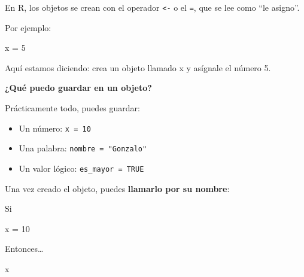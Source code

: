 \documentclass[
  letterpaper,
  DIV=11,
  numbers=noendperiod,
  twoside]{scrreprt}
\newenvironment{Shaded}{\begin{snugshade}}{\end{snugshade}}
\newcommand{\DecValTok}[1]{\textcolor[rgb]{0.68,0.00,0.00}{#1}}
\newcommand{\NormalTok}[1]{\textcolor[rgb]{0.00,0.23,0.31}{#1}}
\newcommand{\OtherTok}[1]{\textcolor[rgb]{0.00,0.23,0.31}{#1}}
\providecommand{\tightlist}{%
  \setlength{\itemsep}{0pt}\setlength{\parskip}{0pt}}\usepackage{longtable,booktabs,array}
\begin{document}
\begin{tcolorbox}[enhanced jigsaw, titlerule=0mm, title=\textcolor{quarto-callout-note-color}{\faInfo}\hspace{0.5em}{Dato}, colback=white, opacityback=0, breakable, toprule=.15mm, left=2mm, leftrule=.75mm, colframe=quarto-callout-note-color-frame, bottomtitle=1mm, rightrule=.15mm, opacitybacktitle=0.6, coltitle=black, arc=.35mm, bottomrule=.15mm, toptitle=1mm, colbacktitle=quarto-callout-note-color!10!white]

En R, los objetos se crean con el operador \texttt{\textless{}-} o el
\texttt{=}, que se lee como ``le asigno''.

Por ejemplo:

\begin{Shaded}
\begin{Highlighting}[]
\NormalTok{x }\OtherTok{=} \DecValTok{5}
\end{Highlighting}
\end{Shaded}

Aquí estamos diciendo: crea un objeto llamado x y asígnale el número 5.

\end{tcolorbox}

\textbf{¿Qué puedo guardar en un objeto?}

Prácticamente todo, puedes guardar:

\begin{itemize}
\tightlist
\item
  Un número: \texttt{x\ =\ 10}
\item
  Una palabra: \texttt{nombre\ =\ "Gonzalo"}
\item
  Un valor lógico: \texttt{es\_mayor\ =\ TRUE}
\end{itemize}

Una vez creado el objeto, puedes \textbf{llamarlo por su nombre}:

Si

\begin{Shaded}
\begin{Highlighting}[]
\NormalTok{x }\OtherTok{=} \DecValTok{10}
\end{Highlighting}
\end{Shaded}

Entonces\ldots{}

\begin{Shaded}
\begin{Highlighting}[]
\NormalTok{x}
\end{Highlighting}
\end{Shaded}
\end{document}
